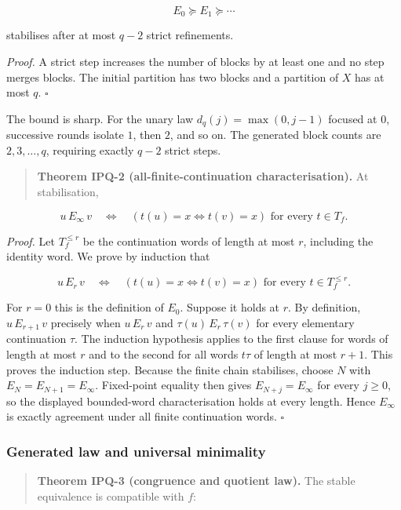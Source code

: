 \documentclass[11pt,a4paper]{article}
\begin{document}
\[E_{0} \succcurlyeq E_{1} \succcurlyeq \cdots\]

stabilises after at most \(q - 2\) strict refinements.

\emph{Proof.} A strict step increases the number of blocks by at least
one and no step merges blocks. The initial partition has two blocks and
a partition of \(X\) has at most \(q\). \(\ensuremath{\square}\)

The bound is sharp. For the unary law \(d_{q}(j) = \max(0,j - 1)\)
focused at \(0\), successive rounds isolate \(1\), then \(2\), and so
on. The generated block counts are \(2,3,\ldots,q\), requiring exactly
\(q - 2\) strict steps.

\begin{quote}
\textbf{Theorem IPQ-2 (all-finite-continuation characterisation).} At
stabilisation,
\end{quote}

\[u\, E_{\infty}\, v\quad \Leftrightarrow \quad\left( t(u) = x \Leftrightarrow t(v) = x \right)\text{ for every }t \in T_{f}.\]

\emph{Proof.} Let \(T_{f}^{\leq r}\) be the continuation words of length
at most \(r\), including the identity word. We prove by induction that

\[u\, E_{r}\, v\quad \Leftrightarrow \quad\left( t(u) = x \Leftrightarrow t(v) = x \right)\text{ for every }t \in T_{f}^{\leq r}.\]

For \(r = 0\) this is the definition of \(E_{0}\). Suppose it holds at
\(r\). By definition, \(u\, E_{r + 1}\, v\) precisely when
\(u\, E_{r}\, v\) and \(\tau(u)\, E_{r}\,\tau(v)\) for every elementary
continuation \(\tau\). The induction hypothesis applies to the first
clause for words of length at most \(r\) and to the second for all words
\(t\tau\) of length at most \(r + 1\). This proves the induction step.
Because the finite chain stabilises, choose \(N\) with
\(E_{N} = E_{N + 1} = E_{\infty}\). Fixed-point equality then gives
\(E_{N + j} = E_{\infty}\) for every \(j \geq 0\), so the displayed
bounded-word characterisation holds at every length. Hence
\(E_{\infty}\) is exactly agreement under all finite continuation words.
\(\ensuremath{\square}\)

\subsubsection{Generated law and universal
minimality}

\begin{quote}
\textbf{Theorem IPQ-3 (congruence and quotient law).} The stable
equivalence is compatible with \(f\):
\end{quote}
\end{document}
